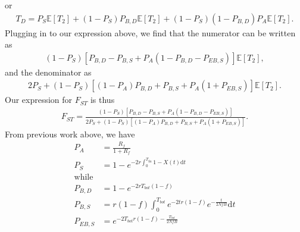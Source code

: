 \documentclass[reqno]{amsart}
\begin{document}
or
\begin{align}
	T_D = P_{S} \mathbb{E}[T_2] + (1-P_{S})P_{B,D}\mathbb{E}[T_2] + (1-P_{S})(1-P_{B,D})P_{A}\mathbb{E}[T_2].
\end{align}
Plugging in to our expression above, we find that the numerator can be written as
\begin{align}
	(1-P_S)[P_{B,D} - P_{B,S} + P_A(1- P_{B,D} - P_{EB,S})]\mathbb{E}[T_2],
\end{align}
and the denominator as
\begin{align}
	2P_S + (1-P_S)[(1-P_A)P_{B,D} + P_{B,S} + P_A(1 + P_{EB,S})]\mathbb{E}[T_2].
\end{align}
Our expression for $F_{ST}$ is thus
\begin{align}
	F_{ST} = \frac{(1-P_S)[P_{B,D} - P_{B,S} + P_A(1- P_{B,D} - P_{EB,S})]}{2P_S + (1-P_S)[(1-P_A)P_{B,D} + P_{B,S} + P_A(1 + P_{EB,S})]}.
\end{align}
From previous work above, we have
\begin{align}
	P_A &= \frac{R_f}{1+R_f} \\
	P_S &= 1 - e^{-2r\int_0^{T_{\text{fix}}}1-X(t)\mathrm{d}t} \\
	\text{while}\\
	P_{B,D} &= 1-  e^{-2rT_{bot}(1-f)} \\
	P_{B,S} &= r(1-f)\int_0^{T_{bot}}e^{-2tr(1-f)}e^{-\frac{t}{2NfB}}\mathrm{d}t\\
	P_{EB,S} &= e^{-2T_{bot}r(1-f)-\frac{T_{bot}}{2NfB}}
\end{align}


\end{document}
